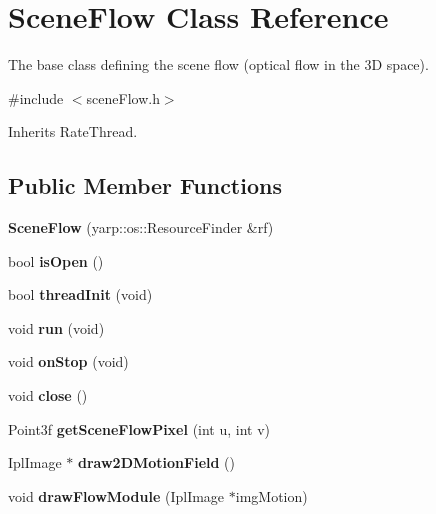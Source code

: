 \section{Scene\+Flow Class Reference}
\label{classSceneFlow}


The base class defining the scene flow (optical flow in the 3\+D space).  




{\ttfamily \#include $<$scene\+Flow.\+h$>$}



Inherits Rate\+Thread.

\subsection*{Public Member Functions}
\begin{DoxyCompactItemize}
\item 
{\bfseries Scene\+Flow} (yarp\+::os\+::\+Resource\+Finder \&rf)\label{classSceneFlow_a09a89df061b9ec7a6964f7d82d8272eb}

\item 
bool {\bfseries is\+Open} ()\label{classSceneFlow_a360b8be98c1c11f3543b6c0744f4da82}

\item 
bool {\bfseries thread\+Init} (void)\label{classSceneFlow_a8603d1225367313e78d74d5453afc647}

\item 
void {\bfseries run} (void)\label{classSceneFlow_a88ebf1f92e8d45073ac603dac1073c38}

\item 
void {\bfseries on\+Stop} (void)\label{classSceneFlow_a87be5bb61cff579f919a496748d33b0b}

\item 
void {\bfseries close} ()\label{classSceneFlow_a3c734406548b2f720c22302ded2233cd}

\item 
Point3f {\bfseries get\+Scene\+Flow\+Pixel} (int u, int v)\label{classSceneFlow_abff8df2a30a081071c27c86c680d9c91}

\item 
Ipl\+Image $\ast$ {\bfseries draw2\+D\+Motion\+Field} ()\label{classSceneFlow_a9a4241e4f2feb15510e8d83a6f8918e8}

\item 
void {\bfseries draw\+Flow\+Module} (Ipl\+Image $\ast$img\+Motion)\label{classSceneFlow_a546f4515e88a56dea1c9fc02d585d550}


\end{DoxyCompactItemize}

